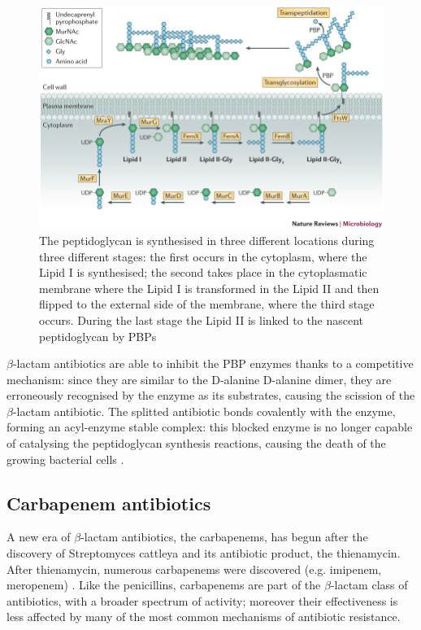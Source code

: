 \documentclass[11pt]{report}
\begin{document}
\clearpage
\begin{figure}[htp]
\centering
\includegraphics[scale=0.50]{immagini gamalero/Peptidoglycan.jpg}
\caption{The peptidoglycan is synthesised in three different locations during three different stages: the first occurs in the cytoplasm, where the Lipid I is synthesised; the second takes place in the cytoplasmatic membrane where the Lipid I is transformed in the Lipid II and then flipped to the external side of the membrane, where the third stage occurs. During the last stage the Lipid II is linked to the nascent peptidoglycan by PBPs \cite{Pinho2013}}
\label{}
\end{figure}


$\beta$-lactam antibiotics are able to inhibit the PBP enzymes thanks to a competitive mechanism: since they are similar to the D-alanine D-alanine dimer, they are erroneously recognised by the enzyme as its substrates, causing the scission of the $\beta$-lactam antibiotic.
The splitted antibiotic bonds covalently with the enzyme, forming an acyl-enzyme stable complex: this blocked enzyme is no longer capable of catalysing the peptidoglycan synthesis reactions, causing the death of the growing bacterial cells \cite{kong2010beta}.

\subsection{Carbapenem antibiotics}
A new era of $\beta$-lactam antibiotics, the carbapenems, has begun after the discovery of Streptomyces cattleya and its antibiotic product, the thienamycin.
After thienamycin, numerous carbapenems were discovered (e.g. imipenem, meropenem) \cite{Birnbaum1985}.
Like the penicillins, carbapenems are part of the $\beta$-lactam class of antibiotics, with a broader spectrum of activity; moreover their effectiveness is less affected by many of the most common mechanisms of antibiotic resistance.
\end{document}
